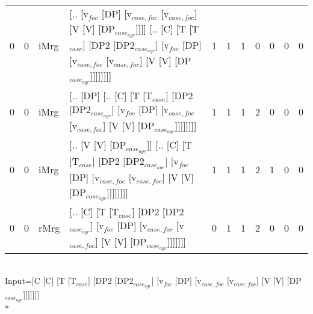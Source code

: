 \begin{tabularx}{\linewidth}{rrlXrrrrrrr}
   0 &   0 & iMrg & [.. [v$_{foc}$ [DP] [v$_{case,foc}$ [v$_{case,foc}$] [V [V] [DP$_{case_{agr}}$]]]] [.. [C] [T [T$_{case}$] [DP2 [DP2$_{case_{agr}}$] [v$_{foc}$ [DP] [v$_{case,foc}$ [v$_{case,foc}$] [V [V] [DP$_{case_{agr}}$]]]]]]]]                                   &            1 &             1 &             1 &             0 &                  0 &              0 &             0 \\
   0 &   0 & iMrg & [.. [DP] [.. [C] [T [T$_{case}$] [DP2 [DP2$_{case_{agr}}$] [v$_{foc}$ [DP] [v$_{case,foc}$ [v$_{case,foc}$] [V [V] [DP$_{case_{agr}}$]]]]]]]]                                                                                           &            1 &             1 &             1 &             2 &                  0 &              0 &             0 \\
   0 &   0 & iMrg & [.. [V [V] [DP$_{case_{agr}}$]] [.. [C] [T [T$_{case}$] [DP2 [DP2$_{case_{agr}}$] [v$_{foc}$ [DP] [v$_{case,foc}$ [v$_{case,foc}$] [V [V] [DP$_{case_{agr}}$]]]]]]]]                                                                          &            1 &             1 &             1 &             2 &                  1 &              0 &             0 \\
   0 &   0 & rMrg & [.. [C] [T [T$_{case}$] [DP2 [DP2$_{case_{agr}}$] [v$_{foc}$ [DP] [v$_{case,foc}$ [v$_{case,foc}$] [V [V] [DP$_{case_{agr}}$]]]]]]]                                                                                                     &            0 &             1 &             1 &             2 &                  0 &              0 &             0 \\
\hline
\end{tabularx}\endgroup\\
\begingroup\scriptsize Input=[C [C] [T [T$_{case}$] [DP2 [DP2$_{case_{agr}}$] [v$_{foc}$ [DP] [v$_{case,foc}$ [v$_{case,foc}$] [V [V] [DP$_{case_{agr}}$]]]]]]]\\*
